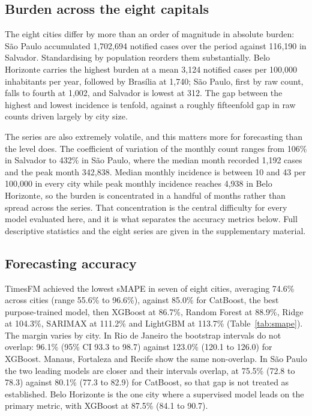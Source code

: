 \documentclass[11pt]{article}
\begin{document}
\subsection{Burden across the eight capitals}

The eight cities differ by more than an order of magnitude in absolute burden: S\~ao Paulo
accumulated 1{,}702{,}694 notified cases over the period against 116{,}190 in Salvador.
Standardising by population reorders them substantially. Belo Horizonte carries the
highest burden at a mean 3{,}124 notified cases per 100{,}000 inhabitants per year,
followed by Bras\'ilia at 1{,}740; S\~ao Paulo, first by raw count, falls to fourth at
1{,}002, and Salvador is lowest at 312. The gap between the highest and lowest incidence is
tenfold, against a roughly fifteenfold gap in raw counts driven largely by city size.

The series are also extremely volatile, and this matters more for forecasting than the
level does. The coefficient of variation of the monthly count ranges from 106\% in
Salvador to 432\% in S\~ao Paulo, where the median month recorded 1{,}192 cases and the
peak month 342{,}838. Median monthly incidence is between 10 and 43 per 100{,}000 in every
city while peak monthly incidence reaches 4{,}938 in Belo Horizonte, so the burden is
concentrated in a handful of months rather than spread across the series. That
concentration is the central difficulty for every model evaluated here, and it is what
separates the accuracy metrics below. Full descriptive statistics and the eight series are
given in the supplementary material.

\subsection{Forecasting accuracy}

TimesFM achieved the lowest sMAPE in seven of eight cities, averaging 74.6\% across
cities (range 55.6\% to 96.6\%), against 85.0\% for CatBoost, the best purpose-trained
model, then XGBoost at 86.7\%, Random Forest at 88.9\%, Ridge at 104.3\%, SARIMAX at
111.2\% and LightGBM at 113.7\% (Table~\ref{tab:smape}). The margin varies by city. In
Rio de Janeiro the bootstrap intervals do not overlap: 96.1\% (95\% CI 93.3 to 98.7)
against 123.0\% (120.1 to 126.0) for XGBoost. Manaus, Fortaleza and Recife show the same
non-overlap. In S\~ao Paulo the two leading models are closer and their intervals overlap,
at 75.5\% (72.8 to 78.3) against 80.1\% (77.3 to 82.9) for CatBoost, so that gap is not
treated as established. Belo Horizonte is the one city where a supervised model leads on
the primary metric, with XGBoost at 87.5\% (84.1 to 90.7).
\end{document}
